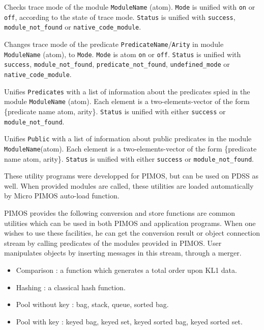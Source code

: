 \begin{itemize}
Checks trace mode of the module \verb|ModuleName| (atom). 
\verb|Mode| is unified with \verb|on| or \verb|off|, according to the state of
trace mode. \verb|Status| is unified with \verb|success|,
\verb|module_not_found| or \verb|native_code_module|.

Changes trace mode of the predicate
\verb|PredicateName|/\verb|Arity| in module \verb|ModuleName| (atom), to
\verb|Mode|. \verb|Mode| is atom \verb|on| or \verb|off|. \verb|Status| is
unified with \verb|success|, \verb|module_not_found|,
\verb|predicate_not_found|, \verb|undefined_mode| or \verb|native_code_module|.

Unifies \verb|Predicates| with
a list of information about the predicates spied in the
module \verb|ModuleName| (atom). Each element
is a two-elements-vector of the form \{predicate name atom, arity\}. 
\verb|Status| is unified with either \verb|success| or \verb|module_not_found|.

Unifies \verb|Public| with a list of information about public predicates
in the module \verb|ModuleName|(atom). Each
element is a two-elements-vector of the form \{predicate name atom, arity\}. 
\verb|Status| is unified with either \verb|success| or \verb|module_not_found|.

\end{itemize}

\newpage
{}

These utility programs were developped for PIMOS, but can be used on PDSS as
well. When provided modules are called, these utilities are loaded
automatically by Micro PIMOS auto-load function.

PIMOS provides the following conversion and store functions are common
utilities which can be used in both PIMOS and application programs.
When one wishes to use these facilities, he can get the conversion result
or object connection stream by calling predicates of the modules provided in
PIMOS. User manipulates objects by inserting messages in this stream,
through a merger.
\begin{itemize}
\item Comparison : a function which generates a total order upon KL1 data.
\item Hashing : a classical hash function.
\item Pool without key : bag, stack, queue, sorted bag.
\item Pool with key : keyed bag, keyed set, keyed sorted bag, keyed sorted set.
\end{itemize}
\vspace{3ex}

